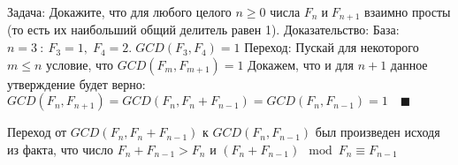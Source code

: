 $\textbf{Задача:}$
Докажите, что для любого целого $n \geq 0$ числа $F_n \; и \; F_{n + 1}$ взаимно просты (то есть их наибольший общий
делитель равен 1).
$\textbf{Доказательство:}$
$\textbf{База:}$
$n = 3 \: \colon \: F_3 = 1, \; F_4 = 2. \; GCD(F_3, F_4) = 1$
$\textbf{Переход:}$
Пускай для некоторого $m \leq n$ условие, что $GCD(F_m, F_{m + 1}) = 1$
Докажем, что и для $n + 1$ данное утверждение будет верно:
$GCD(F_n, F_{n + 1}) = GCD(F_n, F_n + F_{n - 1}) = GCD(F_n, F_{n - 1}) = 1 \quad \blacksquare$

Переход от $GCD(F_n, F_n + F_{n - 1})$ к $GCD(F_n, F_{n - 1})$ был произведен исходя из факта, что число
$F_n + F_{n - 1} > F_n$ и $(F_n + F_{n - 1}) \mod F_n \equiv F_{n - 1}$